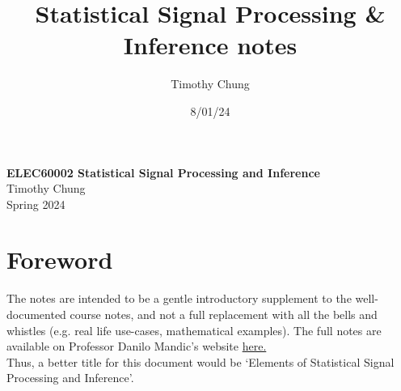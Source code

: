 \documentclass{report}
\title{Statistical Signal Processing \& Inference notes}
\author{Timothy Chung}
\date{8/01/24}
\begin{document}


\begin{titlepage}
    \centering
    \vspace*{1cm}
    \Huge
    \textbf{ELEC60002 Statistical Signal Processing and Inference} \\
    \vspace{1cm}
    \Large
    Timothy Chung \\
    \vspace{1cm}
    Spring 2024 \\
    \vfill
\end{titlepage}

\setcounter{tocdepth}{1}
\tableofcontents
\newpage
\setcounter{chapter}{-1}
\chapter{Foreword}
The notes are intended to be a gentle introductory supplement to the well-documented course notes, and not a full replacement with all the bells and whistles (e.g. real life use-cases, mathematical examples). The full notes are available on Professor Danilo Mandic's website \href{https://www.commsp.ee.ic.ac.uk/~mandic/courses.htm}{here.}\\


Thus, a better title for this document would be `Elements of Statistical Signal Processing and Inference'.





\end{document}
